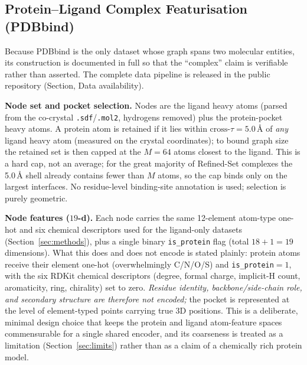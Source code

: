 \documentclass[pdflatex,sn-vancouver-num]{sn-jnl}%
\theoremstyle{thmstyleone}%
\theoremstyle{thmstyletwo}%
\theoremstyle{thmstylethree}%
\begin{document}
\subsection{Protein--Ligand Complex Featurisation (PDBbind)}
\label{ssec:pdbbind_feat}

Because PDBbind is the only dataset whose graph spans two molecular entities, its construction is documented in full so that the ``complex'' claim is verifiable rather than asserted.  The complete data pipeline is released in the public repository (Section, Data availability).

\textbf{Node set and pocket selection.}  Nodes are the ligand heavy atoms (parsed from the co-crystal \texttt{.sdf}/\texttt{.mol2}, hydrogens removed) plus the protein-pocket heavy atoms.  A protein atom is retained if it lies within $\mathrm{cross}\text{-}\tau = 5.0$\,\AA{} of \emph{any} ligand heavy atom (measured on the crystal coordinates); to bound graph size the retained set is then capped at the $M = 64$ atoms closest to the ligand.  This is a hard cap, not an average; for the great majority of Refined-Set complexes the 5.0\,\AA{} shell already contains fewer than $M$ atoms, so the cap binds only on the largest interfaces.  No residue-level binding-site annotation is used; selection is purely geometric.

\textbf{Node features ($19$-d).}  Each node carries the same 12-element atom-type one-hot and six chemical descriptors used for the ligand-only datasets (Section~\ref{sec:methods}), plus a single binary \texttt{is\_protein} flag (total $18+1 = 19$ dimensions).  What this does and does not encode is stated plainly: protein atoms receive their element one-hot (overwhelmingly C/N/O/S) and \texttt{is\_protein}$=1$, with the six RDKit chemical descriptors (degree, formal charge, implicit-H count, aromaticity, ring, chirality) set to zero.  \emph{Residue identity, backbone/side-chain role, and secondary structure are therefore not encoded;} the pocket is represented at the level of element-typed points carrying true 3D positions.  This is a deliberate, minimal design choice that keeps the protein and ligand atom-feature spaces commensurable for a single shared encoder, and its coarseness is treated as a limitation (Section~\ref{sec:limits}) rather than as a claim of a chemically rich protein model.
\end{document}
